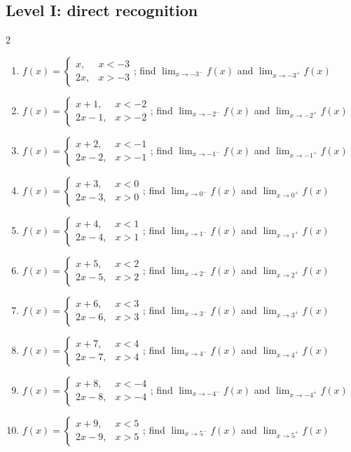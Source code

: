 \documentclass[11pt,oneside]{book}
\begin{document}
\subsection*{Level I: direct recognition}
\begin{multicols}{2}
\begin{enumerate}[leftmargin=*,label=\textbf{\arabic*.},itemsep=0.65\baselineskip]
\item $f(x)=\begin{cases} x, & x<-3\\ 2 x, & x>-3 \end{cases}$; find $\lim_{x\to -3^-}f(x)$ and $\lim_{x\to -3^+}f(x)$
\item $f(x)=\begin{cases} x + 1, & x<-2\\ 2 x - 1, & x>-2 \end{cases}$; find $\lim_{x\to -2^-}f(x)$ and $\lim_{x\to -2^+}f(x)$
\item $f(x)=\begin{cases} x + 2, & x<-1\\ 2 x - 2, & x>-1 \end{cases}$; find $\lim_{x\to -1^-}f(x)$ and $\lim_{x\to -1^+}f(x)$
\item $f(x)=\begin{cases} x + 3, & x<0\\ 2 x - 3, & x>0 \end{cases}$; find $\lim_{x\to 0^-}f(x)$ and $\lim_{x\to 0^+}f(x)$
\item $f(x)=\begin{cases} x + 4, & x<1\\ 2 x - 4, & x>1 \end{cases}$; find $\lim_{x\to 1^-}f(x)$ and $\lim_{x\to 1^+}f(x)$
\item $f(x)=\begin{cases} x + 5, & x<2\\ 2 x - 5, & x>2 \end{cases}$; find $\lim_{x\to 2^-}f(x)$ and $\lim_{x\to 2^+}f(x)$
\item $f(x)=\begin{cases} x + 6, & x<3\\ 2 x - 6, & x>3 \end{cases}$; find $\lim_{x\to 3^-}f(x)$ and $\lim_{x\to 3^+}f(x)$
\item $f(x)=\begin{cases} x + 7, & x<4\\ 2 x - 7, & x>4 \end{cases}$; find $\lim_{x\to 4^-}f(x)$ and $\lim_{x\to 4^+}f(x)$
\item $f(x)=\begin{cases} x + 8, & x<-4\\ 2 x - 8, & x>-4 \end{cases}$; find $\lim_{x\to -4^-}f(x)$ and $\lim_{x\to -4^+}f(x)$
\item $f(x)=\begin{cases} x + 9, & x<5\\ 2 x - 9, & x>5 \end{cases}$; find $\lim_{x\to 5^-}f(x)$ and $\lim_{x\to 5^+}f(x)$
\end{enumerate}
\end{multicols}
\end{document}
